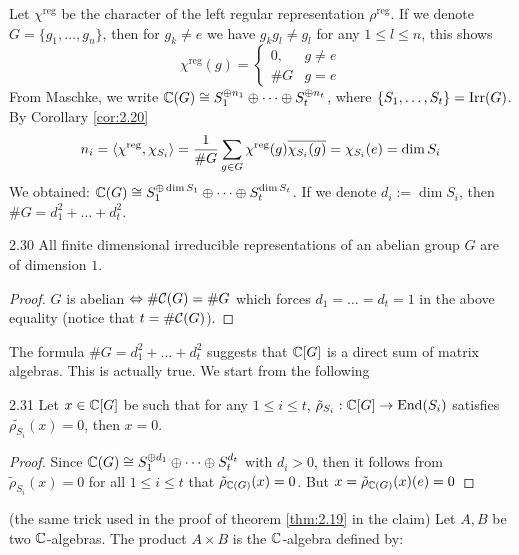 \documentclass[twoside = false,	%
		headsepline,		%
		parskip = true,
		]{scrbook}						%
\begin{document}
    Let $\chi^{\text{reg}}$ be the character of the left regular representation $\rho^{\text{reg}}$. If we denote $G = \{g_1,\dots,g_n\}$, then for $g_k \neq e$ we have $g_k g_l \neq g_l$ for any $1 \leq l \leq n$, this shows
    \begin{equation*}
        \chi^{\mathrm{reg}}(g) = \left\{ \begin{array}{cc}
            0, & g \neq e \\
            \#G & g = e
        \end{array}\right.
    \end{equation*}
    From Maschke, we write $\mathbb C(G) \cong S_1^{\oplus n_1} \oplus \dots \oplus S_t^{\oplus n_t}$, where $\{S_1,\dots,S_t\} = \mathrm{Irr}(G)$. By Corollary \ref{cor:2.20}
    \begin{equation*}
        n_i = \left\langle \chi^{\text{reg}},\chi_{S_i}\right\rangle = \frac{1}{\#G}\sum_{g \in G} \chi^{\text{reg}}(g) \overline{\chi_{S_i}(g)} = \chi_{S_i}(e) = \dim S_i
    \end{equation*}
    We obtained: $\mathbb C(G) \cong S_1 ^{\oplus \dim S_1} \oplus \dots \oplus S_t^{\dim S_t}$. If we denote $d_i := \dim S_i$, then $\#G = d_1^2 + \dots + d_t^2$.
    \begin{corollary}{}{2.30}
        All finite dimensional irreducible representations of an abelian group $G$ are of dimension $1$.
    \end{corollary}
    \begin{proof}
        $G$ is abelian $\Leftrightarrow \#\mathcal C(G) = \# G$ which forces $d_1  = \dots = d_t = 1$ in the above equality (notice that $t = \#\mathcal C(G)$).
    \end{proof}
    The formula $\#G = d_1^2  +\dots + d_t^2$ suggests that $\mathbb C[G]$ is a direct sum of matrix algebras. This is actually true. We start from the following
    \begin{corollary}{}{2.31}
        Let $x \in \mathbb C[G]$ be such that for any $1 \leq i \leq t$, $\tilde{\rho}_{S_i}: \mathbb C[G] \to \mathrm{End}(S_i)$ satisfies $\tilde{\rho_{S_i}}(x) = 0$, then $x = 0$.
    \end{corollary}
    \begin{proof}
        Since $\mathbb C(G) \cong S_1 ^{\oplus d_1} \oplus \dots \oplus S_t^{d_t}$ with $d_i > 0$, then it follows from $\tilde{\rho}_{S_i}(x) = 0$ for all $1 \leq i \leq t$ that $\tilde \rho_{\mathbb C(G)}(x) = 0$. But $x = \tilde{\rho}_{\mathbb C(G)}(x)(e) = 0$
    \end{proof}
    (the same trick used in the proof of theorem \ref{thm:2.19} in the claim)
    Let $A,B$ be two $\mathbb C$-algebras. The product $A \times B$ is the $\mathbb C$-algebra defined by:
\end{document}
